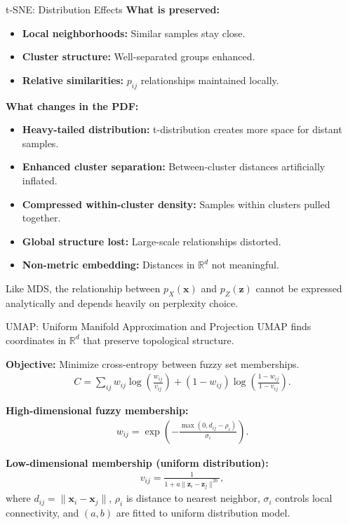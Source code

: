 \documentclass{beamer}
\begin{document}
\begin{frame}{t-SNE: Distribution Effects}
  \textbf{What is preserved:}
  \begin{itemize}
    \item \textbf{Local neighborhoods:} Similar samples stay close.
    \item \textbf{Cluster structure:} Well-separated groups enhanced.
    \item \textbf{Relative similarities:} $p_{ij}$ relationships maintained locally.
  \end{itemize}
  
  \textbf{What changes in the PDF:}
  \begin{itemize}
  \item \textbf{Heavy-tailed distribution:} t-distribution creates more space for distant samples.
  \item \textbf{Enhanced cluster separation:} Between-cluster distances artificially inflated.
  \item \textbf{Compressed within-cluster density:} Samples within clusters pulled together.
  \item \textbf{Global structure lost:} Large-scale relationships distorted.
  \item \textbf{Non-metric embedding:} Distances in $\mathbb{R}^d$ not meaningful.
  \end{itemize}
    
  \alert{Like MDS, the relationship between $p_X(\mathbf{x})$ and $p_Z(\mathbf{z})$ cannot be expressed analytically and depends heavily on perplexity choice.}
\end{frame}

\begin{frame}{UMAP: Uniform Manifold Approximation and Projection}
  UMAP finds coordinates in $\mathbb{R}^d$ that
  \alert{preserve topological structure}.
  
  \textbf{Objective:} Minimize cross-entropy between fuzzy set memberships.
  \begin{align*}
    C = \sum_{ij} w_{ij} \log\left(\frac{w_{ij}}{v_{ij}}\right) + (1-w_{ij}) \log\left(\frac{1-w_{ij}}{1-v_{ij}}\right).
  \end{align*}
  
  \textbf{High-dimensional fuzzy membership:}
  \begin{align*}
    w_{ij} = \exp\left(-\frac{\max(0, d_{ij} - \rho_i)}{\sigma_i}\right).
  \end{align*}
   
  \textbf{Low-dimensional membership (uniform distribution):}
  \begin{align*}
    v_{ij} = \frac{1}{1 + a\|\mathbf{z}_i - \mathbf{z}_j\|^{2b}},
  \end{align*}  
  where $d_{ij}=\|\mathbf{x}_i-\mathbf{x}_j\|$, $\rho_i$ is distance
  to nearest neighbor, $\sigma_i$ controls local connectivity, and
  $(a,b)$ are fitted to uniform distribution model.
\end{frame}
\end{document}
